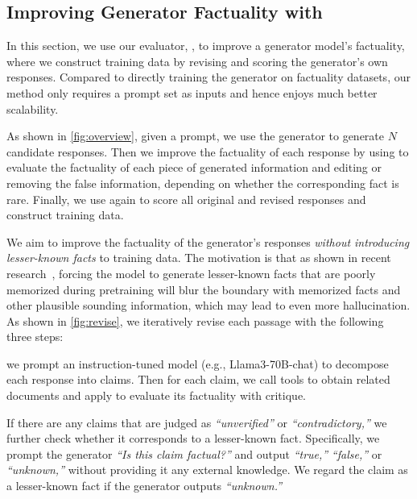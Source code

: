 \subsection{Improving Generator Factuality with \fencemodelname}
\label{sec:improve_factuality}
In this section, we use our evaluator, \fencemodelname, to improve a generator model's factuality, where we construct training data by revising and scoring the generator's own responses.
Compared to directly training the generator on factuality datasets, our method only requires a prompt set as inputs and hence enjoys much better scalability.

As shown in \autoref{fig:overview}, given a prompt, we use the generator to generate $N$ candidate responses.
Then we improve the factuality of each response by using \fencemodelname to evaluate the factuality of each piece of generated information and editing or removing the false information, depending on whether the corresponding fact is rare.
Finally, we use \fencemodelname again to score all original and revised responses and construct training data.

We aim to improve the factuality of the generator's responses \textit{without introducing lesser-known facts} to training data. The motivation is that as shown in recent research~\citep{understand-finetuning,finetuning-on-new}, forcing the model to generate lesser-known facts that are poorly memorized during pretraining will blur the boundary with memorized facts and other plausible sounding information, which may lead to even more hallucination.
As shown in \autoref{fig:revise}, we iteratively revise each passage with the following three steps: 

we prompt an instruction-tuned model (e.g., Llama3-70B-chat) to decompose each response into claims. Then for each claim, we call tools to obtain related documents and apply \fencemodelname to evaluate its factuality with critique. 

If there are any claims that are judged as \textit{``unverified''} or \textit{``contradictory,''} we further check whether it corresponds to a lesser-known fact. 
Specifically, we prompt the generator \textit{``Is this claim factual?''} and output \textit{``true,''} \textit{``false,''} or \textit{``unknown,''} without providing it any external knowledge. We regard the claim as a lesser-known fact if the generator outputs \textit{``unknown.''}

